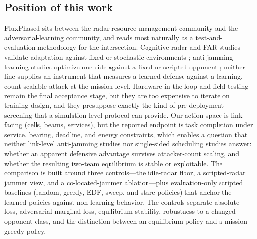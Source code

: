 \subsection{Position of this work}
FluxPhased sits between the radar resource-management community and the adversarial-learning community, and reads most naturally as a test-and-evaluation methodology for the intersection. Cognitive-radar and FAR studies validate adaptation against fixed or stochastic environments \cite{haykin2006cognitive,bell2015jstsp,charlish2020development}; anti-jamming learning studies optimize one side against a fixed or scripted opponent \cite{jiang2023dsp,xie2023multijam,jia2025survey}; neither line supplies an instrument that measures a learned defense against a learning, count-scalable attack at the mission level. Hardware-in-the-loop and field testing remain the final acceptance stage, but they are too expensive to iterate on training design, and they presuppose exactly the kind of pre-deployment screening that a simulation-level protocol can provide. Our action space is link-facing (cells, beams, services), but the reported endpoint is task completion under service, bearing, deadline, and energy constraints, which enables a question that neither link-level anti-jamming studies nor single-sided scheduling studies answer: whether an apparent defensive advantage survives attacker-count scaling, and whether the resulting two-team equilibrium is stable or exploitable. The comparison is built around three controls---the idle-radar floor, a scripted-radar jammer view, and a co-located-jammer ablation---plus evaluation-only scripted baselines (random, greedy, EDF, sweep, and stare policies) that anchor the learned policies against non-learning behavior. The controls separate absolute loss, adversarial marginal loss, equilibrium stability, robustness to a changed opponent class, and the distinction between an equilibrium policy and a mission-greedy policy.
